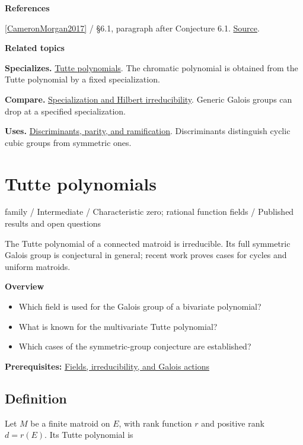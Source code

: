 \documentclass[11pt,a4paper,oneside,openany]{book}
\newenvironment{sources}{\par\smallskip\begingroup\footnotesize\color{atlasgray}\leftskip=10pt\setlength{\parskip}{2pt}}{\par\endgroup\smallskip}
\begin{document}
\begin{sources}
\textbf{References}\par\smallskip
\noindent\hyperlink{ref:CameronMorgan2017}{[CameronMorgan2017]} / §6.1, paragraph after Conjecture 6.1.  \href{https://doi.org/10.37236/6578}{Source}.\par
\end{sources}\color{black}
\par\medskip\begingroup\footnotesize\setlength{\parskip}{1pt}\textbf{\sffamily\color{atlasgreen}Related topics}\par
\color{black}\textbf{Specializes.} \hyperlink{article:tutte-polynomials}{Tutte polynomials}. The chromatic polynomial is obtained from the Tutte polynomial by a fixed specialization.\par
\color{black}\textbf{Compare.} \hyperlink{article:specialization}{Specialization and Hilbert irreducibility}. Generic Galois groups can drop at a specified specialization.\par
\color{black}\textbf{Uses.} \hyperlink{article:discriminants}{Discriminants, parity, and ramification}. Discriminants distinguish cyclic cubic groups from symmetric ones.\par
\endgroup
\chapter{Tutte polynomials}\label{article:tutte-polynomials}\hypertarget{article:tutte-polynomials}{}\color{black}
{\sffamily\small\color{atlasgold}family / Intermediate / Characteristic zero; rational function fields / Published results and open questions}\par\medskip
The Tutte polynomial of a connected matroid is irreducible. Its full symmetric Galois group is conjectural in general; recent work proves cases for cycles and uniform matroids.\par\medskip
\textbf{Overview}\begin{itemize}
\item Which field is used for the Galois group of a bivariate polynomial?
\item What is known for the multivariate Tutte polynomial?
\item Which cases of the symmetric-group conjecture are established?
\end{itemize}
{\small\textbf{Prerequisites:} \hyperlink{article:foundations}{Fields, irreducibility, and Galois actions}}\par
{}\section{Definition}
\color{black} Let \(M\) be a finite matroid on \(E\), with rank function \(r\) and positive rank \(d=r(E)\). Its Tutte polynomial is\par
\end{document}
